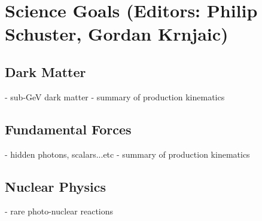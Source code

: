 \section{Science Goals (Editors: Philip Schuster, Gordan Krnjaic)}

\subsection{Dark Matter}
 - sub-GeV dark matter
 - summary of production kinematics

\subsection{Fundamental Forces}
 - hidden photons, scalars...etc
 - summary of production kinematics 

\subsection{Nuclear Physics}
 - rare photo-nuclear reactions
